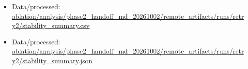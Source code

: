 \begin{itemize}[leftmargin=1.4em,noitemsep]
\item Data/processed: \begingroup\scriptsize\url{ablation/analysis/phase2_handoff_md_20261002/remote_artifacts/runs/retry2/stability_summary.csv}\endgroup
\item Data/processed: \begingroup\scriptsize\url{ablation/analysis/phase2_handoff_md_20261002/remote_artifacts/runs/retry2/stability_summary.json}\endgroup
\end{itemize}
